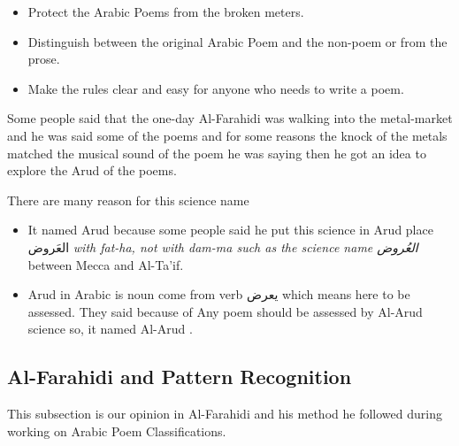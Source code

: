   \begin{itemize}
  \item Protect the Arabic Poems from the broken meters.
  \item Distinguish between the original Arabic Poem and the non-poem or from the prose.
    \item Make the rules clear and easy for anyone who needs to write a poem.
  \end{itemize}

  Some people said that the one-day Al-Farahidi was walking into the metal-market and he was said some of the poems and for some reasons the knock of the metals matched the musical sound of the poem he was saying then he got an idea to explore the Arud of the poems.

 There are many reason for this science name 
  \begin{itemize}
  \item It named Arud because some people said he put this science in Arud place \textarabic{العَروض} \textit{with fat-ha, not with dam-ma such as the science name \textarabic{العُروض} } between Mecca and Al-Ta'if\cite{AlQuaed}.
  \item Arud in Arabic is noun come from verb \textarabic{يعرض} which means here to be assessed. They said because of Any poem should be assessed by Al-Arud science so, it named Al-Arud \cite{Alkafi1994}.
  \end{itemize}
  
  

  
    \newpage
    \subsection{Al-Farahidi and Pattern Recognition}
    This subsection is our opinion in Al-Farahidi and his method he followed during working on Arabic Poem Classifications.

